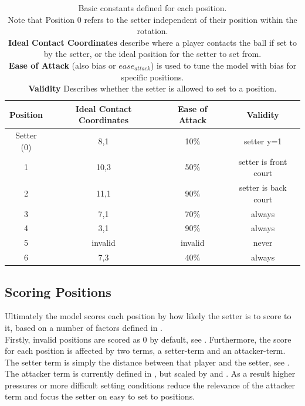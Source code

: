 \documentclass[main.tex]{subfiles}
\begin{document}
      \begin{table}
        \centering
        \caption{Basic constants defined for each position. \\
          Note that Position 0 refers to the setter independent of their position within the rotation. \\
          \textbf{Ideal Contact Coordinates} describe where a player contacts the ball if set to by the setter, or the ideal position for the setter to set from. \\
          \textbf{Ease of Attack} (also bias or \(ease_{attack}\)) is used to tune the model with bias for specific positions. \\
          \textbf{Validity} Describes whether the setter is allowed to set to a position. 
        }
        \footnotesize
        \begin{tabular}{ c | c c c }
          \hline
          Position  & Ideal Contact Coordinates & Ease of Attack & Validity \\ \hline \hline
          Setter (0) &  8,1 & 10\% & setter y=1 \\
          1 & 10,3 & 50\% & setter is front court \\
          2 & 11,1 & 90\% & setter is back court \\
          3 & 7,1 & 70\% &  always \\
          4 & 3,1 & 90\% & always \\
          5 & invalid & invalid & never\\
          6 & 7,3 & 40\% & always \\
          \hline 
        \end{tabular}
        \label{tab:positions}
        \normalsize
      \end{table}
      
    \subsection{Scoring Positions}
      
      Ultimately the model scores each position by how likely the setter is to score to it, based on a number of factors defined in .\\
      Firstly, invalid positions are scored as 0 by default, see . Furthermore, the score for each position is affected by two terms, a setter-term and an attacker-term. The setter term is simply the distance between that player and the setter, see . The attacker term is currently defined in , but scaled by  and . As a result higher pressures or more difficult setting conditions reduce the relevance of the attacker term and focus the setter on easy to set to positions.
      
\end{document}
